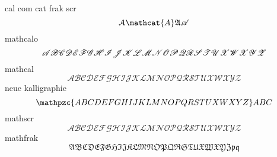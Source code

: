 \documentclass{article}
\begin{document}
cal com cat frak scr
\def\letters{ABCDEFGHIJKLMNOPQRSTUXWXYZ}
    \[
        \mathcal{A} \mathcat{A} \mathfrak{A} \mathscr{A}
    \]
    mathcalo
    \[
        \expandafter\mathcalo\expandafter{\letters}
    \] 
    mathcal
    \[
        \expandafter\mathcal\expandafter{\letters}
    \] 
    neue kalligraphie
    \[
        \expandafter\mathpzc\expandafter{\letters} ABC
    \] 
    mathscr
    \[
        \expandafter\mathscr\expandafter{\letters}
    \] 
    mathfrak
    \[
        \expandafter\mathfrak\expandafter{\letters}\mathfrak{p}\mathfrak{q}
    \] 
\end{document}
